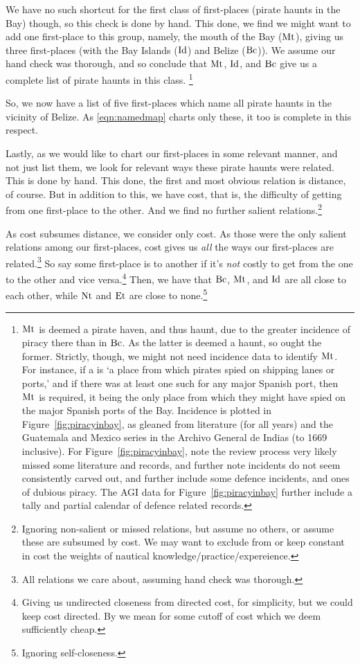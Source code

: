			We have no such shortcut for the first class of first-places (pirate haunts in the Bay) though, so this check is done by hand. This done, we find we might want to add one first-place to this group, namely, the mouth of the Bay (\(\operatorname{Mt}\)), giving us three first-places (with the Bay Islands (\(\operatorname{Id}\)) and Belize (\(\operatorname{Bc}\))). We assume our hand check was thorough, and so conclude that \(\operatorname{Mt}\), \(\operatorname{Id}\), and \(\operatorname{Bc}\) give us a complete list of pirate haunts in this class.%
			\footnote{\(\operatorname{Mt}\) is deemed a pirate haven, and thus haunt, due to the greater incidence of piracy there than in \(\operatorname{Bc}\). As the latter is deemed a haunt, so ought the former. Strictly, though, we might not need incidence data to identify \(\operatorname{Mt}\). For instance, if a  is `a place from which pirates spied on shipping lanes or ports,' and if there was at least one such for any major Spanish port, then \(\operatorname{Mt}\) is required, it being the only place from which they might have spied on the major Spanish ports of the Bay. Incidence is plotted in Figure~\ref{fig:piracyinbay}, as gleaned from literature (for all years) and the Guatemala and Mexico series in the Archivo General de Indias (to 1669 inclusive). For Figure~\ref{fig:piracyinbay}, note the review process very likely missed some literature and records, and further note incidents do not seem consistently carved out, and further include some defence incidents, and ones of dubious piracy. The AGI data for Figure~\ref{fig:piracyinbay} further include a tally and partial calendar of defence related records.}
			
			So, we now have a list of five first-places which name all pirate haunts in the vicinity of Belize. As \ref{eqn:namedmap} charts only these, it too is complete in this respect.
		
			Lastly, as we would like to chart our first-places in some relevant manner, and not just list them, we look for relevant ways these pirate haunts were related. This is done by hand. This done, the first and most obvious relation is distance, of course. But in addition to this, we have cost, that is, the difficulty of getting from one first-place to the other. And we find no further salient relations.\footnote{Ignoring non-salient or missed relations, but assume no others, or assume these are subsumed by cost. We may want to exclude from or keep constant in cost the weights of nautical knowledge/practice/expereience.}
			
			As cost subsumes distance, we consider only cost. As those were the only salient relations among our first-places, cost gives us \emph{all} the ways our first-places are related.\footnote{All relations we care about, assuming hand check was thorough.} So say some first-place is  to another if it's \emph{not} costly to get from the one to the other and vice versa.\footnote{Giving us undirected closeness from directed cost, for simplicity, but we could keep cost directed. By  we mean for some cutoff of cost which we deem sufficiently cheap.} Then, we have that \(\operatorname{Bc}\), \(\operatorname{Mt}\), and \(\operatorname{Id}\) are all close to each other, while \(\operatorname{Nt}\) and \(\operatorname{Et}\) are close to none.\footnote{Ignoring self-closeness.}
			
